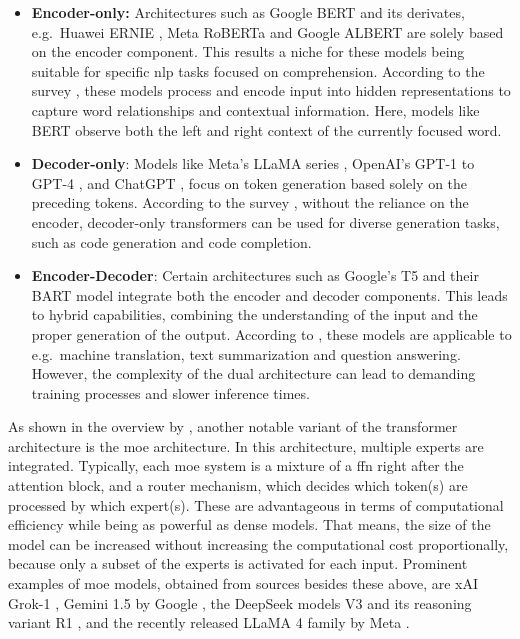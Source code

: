 \begin{itemize}
   \item \textbf{Encoder-only:} Architectures such as Google BERT \cite{devlin_bert_2019} and its derivates, e.g.\ Huawei ERNIE \cite{zhang_ernie_2019}, Meta RoBERTa \cite{liu_roberta_2019} and Google ALBERT \cite{lan_albert_2020} are solely based on the encoder component. This results a niche for these models being suitable for specific \ac{nlp} tasks focused on comprehension. According to the survey \cite{hou_large_2024}, these models process and encode input into hidden representations to capture word relationships and contextual information. Here, models like BERT observe both the left and right context of the currently focused word.
   
   \item \textbf{Decoder-only}:
   Models like Meta's LLaMA series \cite{touvron_llama_2023}, OpenAI's GPT-1 \cite{radford_improving_2018} to GPT-4 \cite{openai_gpt-4_2024}, and ChatGPT \cite{openai_introducing_2022}, focus on token generation based solely on the preceding tokens. According to the survey \cite{hou_large_2024}, without the reliance on the encoder, decoder-only transformers can be used for diverse generation tasks, such as code generation and code completion.

   \item \textbf{Encoder-Decoder}: Certain architectures such as Google's T5 \cite{raffel_exploring_2023} and their BART model \cite{lewis_bart_2019} integrate both the encoder and decoder components. This leads to hybrid capabilities, combining the understanding of the input and the proper generation of the output. According to \cite{wang_history_2024}, these models are applicable to e.g.\ machine translation, text summarization and question answering. However, the complexity of the dual architecture can lead to demanding training processes and slower inference times.
\end{itemize}

 As shown in the overview by \cite{naveed_comprehensive_2024}, another notable variant of the transformer architecture is the \ac{moe} \cite{shazeer_outrageously_2017} architecture. In this architecture, multiple experts are integrated. Typically, each \ac{moe} system is a mixture of a \ac{ffn} right after the attention block, and a router mechanism, which decides which token(s) are processed by which expert(s). These are advantageous in terms of computational efficiency while being as powerful as dense models. That means, the size of the model can be increased without increasing the computational cost proportionally, because only a subset of the experts is activated for each input. Prominent examples of \ac{moe} models, obtained from sources besides these above, are xAI Grok-1 \cite{xai_open_2024}, Gemini 1.5 by Google \cite{team_gemini_2024-1}, the DeepSeek models V3 \cite{deepseek-ai_deepseek-v3_2025} and its reasoning variant R1 \cite{deepseek-ai_deepseek-r1_2025}, and the recently released LLaMA 4 family by Meta \cite{meta_ai_llama_2025}.

